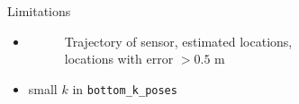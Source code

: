 \begin{frame}[noframenumbering]{Limitations}

\begin{itemize}
\item
\begin{minipage}{.6\textwidth}
  \begin{figure}
    
    \caption{\footnotesize \textcolor{exp1_blue}{Trajectory of sensor},
                           \textcolor{exp1_green}{estimated locations},\\
                           \textcolor{exp1_red}{locations with error $ > 0.5$ m}}
  \end{figure}
\end{minipage}
\item small $k$ in \texttt{bottom\_k\_poses}
\end{itemize}

\end{frame}
